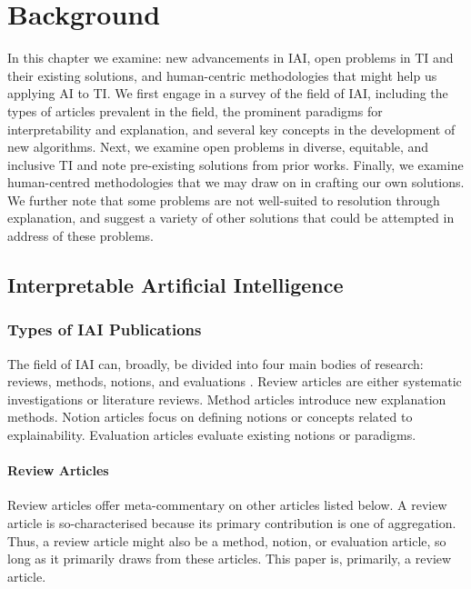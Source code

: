 

\chapter{\label{ch:background}Background} 
In this chapter we examine: new advancements in  IAI, open problems in TI and their existing solutions, and human-centric methodologies that might help us applying AI to TI. We first engage in a survey of the field of IAI, including the types of articles prevalent in the field, the prominent paradigms for interpretability and explanation, and several key concepts in the development of new algorithms. Next, we examine open problems in diverse, equitable, and inclusive TI and note pre-existing solutions from prior works. Finally, we examine human-centred methodologies that we may draw on in crafting our own solutions. We further note that some problems are not well-suited to resolution through explanation, and suggest a variety of other solutions that could be attempted in address of these problems.

\minitoc

\section{Interpretable Artificial Intelligence}
\subsection{Types of IAI Publications}

The field of IAI can, broadly, be divided into four main bodies of research: reviews, methods, notions, and evaluations \cite{vilone_explainable_2020}. Review articles are either systematic investigations or literature reviews. Method articles introduce new explanation methods. Notion articles focus on defining notions or concepts related to explainability. Evaluation articles evaluate existing notions or paradigms.

\subsubsection{Review Articles}
Review articles offer meta-commentary on other articles listed below. A review article is so-characterised because its primary contribution is one of aggregation. Thus, a review article might also be a method, notion, or evaluation article, so long as it primarily draws from these articles. This paper is, primarily, a review article.

